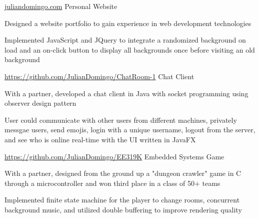 \begin{cventries}
  \cventry
    {\url{juliandomingo.com}}
    {Personal Website}
    {}
    {}
    {
      \begin{cvitems}
        \item Designed a website portfolio to gain experience in web development technologies
        \item Implemented JavaScript and JQuery to integrate a randomized background on load and an on-click button to display all backgrounds once before visiting an old background
      \end{cvitems}
    }
  \cventry
    {\url{https://github.com/JulianDomingo/ChatRoom-1}}
    {Chat Client}
    {}
    {}
    {
      \begin{cvitems}
        \item {With a partner, developed a chat client in Java with socket programming using observer design pattern}
        \item {User  could communicate with other users from different machines, privately messgae users, send emojis, login with a unique username, logout from the server, and see who is online real-time with the UI written in JavaFX}
      \end{cvitems}
    }
  \cventry
    {\url{https://github.com/JulianDomingo/EE319K}}
    {Embedded Systems Game}
    {}
    {}
    {
      \begin{cvitems}
        \item {With a partner, designed from the ground up a "dungeon crawler" game in C through a microcontroller and won third place in a class of 50+ teams}
        \item {Implemented finite state machine for the player to change rooms, concurrent background music, and utilized double buffering to improve rendering quality}
      \end{cvitems}
    }
\end{cventries}
